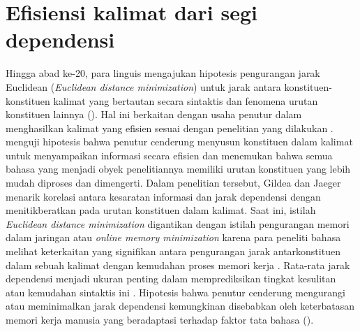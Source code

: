 \section{Efisiensi kalimat dari segi dependensi}
Hingga abad ke-20, para linguis mengajukan hipotesis pengurangan jarak Euclidean (\textit{Euclidean distance minimization}) untuk jarak antara konstituen-konstituen kalimat yang bertautan secara sintaktis dan fenomena urutan konstituen lainnya (\citealp{i2004euclidean, ferrer2008some}). Hal ini berkaitan dengan usaha penutur dalam menghasilkan kalimat yang efisien sesuai dengan penelitian yang dilakukan \cite{gildea2015human}. \cite{gildea2015human} menguji hipotesis bahwa penutur cenderung menyusun konstituen dalam kalimat untuk menyampaikan informasi secara efisien dan menemukan bahwa semua bahasa yang menjadi obyek penelitiannya memiliki urutan konstituen yang lebih mudah diproses dan dimengerti. Dalam penelitian tersebut, Gildea dan Jaeger menarik korelasi antara kesaratan informasi dan jarak dependensi dengan menitikberatkan pada urutan konstituen dalam kalimat. Saat ini, istilah \textit{Euclidean distance minimization} digantikan dengan istilah pengurangan memori dalam jaringan atau \textit{online memory minimization} karena para peneliti bahasa melihat keterkaitan yang signifikan antara pengurangan jarak antarkonstituen dalam sebuah kalimat dengan kemudahan proses memori kerja \citep{ferrer2015placement}. Rata-rata jarak dependensi menjadi ukuran penting dalam memprediksikan tingkat kesulitan atau kemudahan sintaktis ini \citep{hudson1995measuring}. Hipotesis bahwa penutur cenderung mengurangi atau meminimalkan jarak dependensi kemungkinan disebabkan oleh keterbatasan memori kerja manusia yang beradaptasi terhadap faktor tata bahasa (\citealp{i2004euclidean, ferrer2016non, buch2006discontinuous, liu2008dependency, gildea2010grammars, futrell2015large}).

